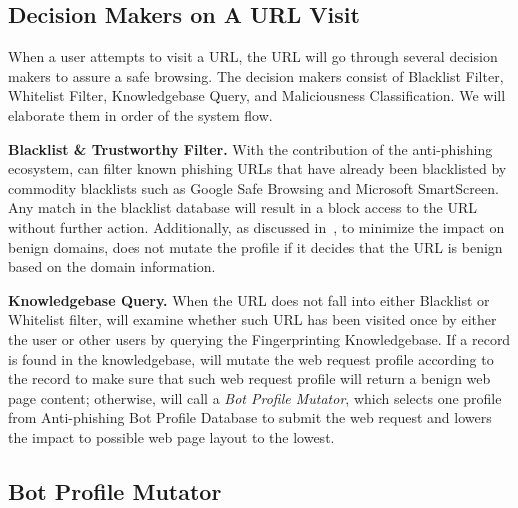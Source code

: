\subsection{Decision Makers on A URL Visit}

When a user attempts to visit a URL, the URL will go through several decision makers to assure a safe browsing.
The decision makers consist of Blacklist Filter, Whitelist Filter, Knowledgebase Query, and Maliciousness Classification.
We will elaborate them in order of the system flow.

\noindent
\textbf{Blacklist \& Trustworthy Filter.}
With the contribution of the anti-phishing ecosystem, \spartacus can filter known phishing URLs that have already been blacklisted by commodity blacklists such as Google Safe Browsing and Microsoft SmartScreen.
Any match in the blacklist database will result in a block access to the URL without further action.
Additionally, as discussed in~, to minimize the impact on benign domains, \spartacus does not mutate the profile if it decides that the URL is benign based on the domain information.


\noindent
\textbf{Knowledgebase Query.}
When the URL does not fall into either Blacklist or Whitelist filter, \spartacus will examine whether such URL has been visited once by either the user or other users by querying the Fingerprinting Knowledgebase.
If a record is found in the knowledgebase, \spartacus will mutate the web request profile according to the record to make sure that such web request profile will return a benign web page content;
otherwise, \spartacus will call a \emph{Bot Profile Mutator}, which selects one profile from Anti-phishing Bot Profile Database to submit the web request and lowers the impact to possible web page layout to the lowest.



\subsection{Bot Profile Mutator}

